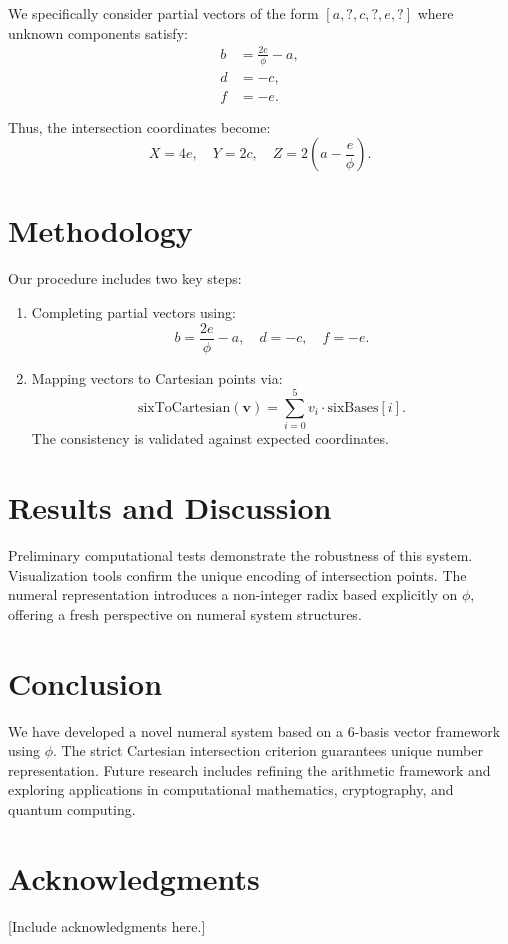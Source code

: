 \documentclass{article}
\begin{document}
We specifically consider partial vectors of the form $[a, ?, c, ?, e, ?]$ where unknown components satisfy:
\begin{align*}
b &= \frac{2e}{\phi} - a,\\
d &= -c,\\
f &= -e.
\end{align*}

Thus, the intersection coordinates become:
\[
X = 4e, \quad Y = 2c, \quad Z = 2\left(a - \frac{e}{\phi}\right).
\]

\section{Methodology}
Our procedure includes two key steps:
\begin{enumerate}
\item Completing partial vectors using:
\[ b = \frac{2e}{\phi} - a, \quad d = -c, \quad f = -e. \]

\item Mapping vectors to Cartesian points via:
\[
\text{sixToCartesian}(\mathbf{v}) = \sum_{i=0}^{5} v_i \cdot \text{sixBases}[i].
\]
The consistency is validated against expected coordinates.
\end{enumerate}

\section{Results and Discussion}
Preliminary computational tests demonstrate the robustness of this system. Visualization tools confirm the unique encoding of intersection points. The numeral representation introduces a non-integer radix based explicitly on $\phi$, offering a fresh perspective on numeral system structures.

\section{Conclusion}
We have developed a novel numeral system based on a 6-basis vector framework using $\phi$. The strict Cartesian intersection criterion guarantees unique number representation. Future research includes refining the arithmetic framework and exploring applications in computational mathematics, cryptography, and quantum computing.

\section*{Acknowledgments}
[Include acknowledgments here.]
\end{document}
